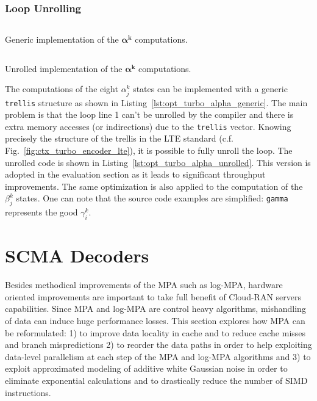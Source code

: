 \subsubsection{Loop Unrolling}

\begin{listing}[htp]
  \inputminted[frame=lines,linenos]{C++}{\curChapter/src/turbo/alpha_generic.cpp}
  \caption{Generic implementation of the $\bm{\alpha^k}$ computations.}
  \label{lst:opt_turbo_alpha_generic}
\end{listing}

\begin{listing}[htp]
  \inputminted[frame=lines,linenos]{C++}{\curChapter/src/turbo/alpha_unrolled.cpp}
  \caption{Unrolled implementation of the $\bm{\alpha^k}$ computations.}
  \label{lst:opt_turbo_alpha_unrolled}
\end{listing}

The computations of the eight $\alpha^k_j$ states can be implemented with
a generic \verb|trellis| structure as shown in
Listing~\ref{lst:opt_turbo_alpha_generic}. The main problem is that the loop
line 1 can't be unrolled by the compiler and there is extra memory accesses (or
indirections) due to the \verb|trellis| vector. Knowing precisely the structure
of the trellis in the LTE standard (c.f. Fig.~\ref{fig:ctx_turbo_encoder_lte}),
it is possible to fully unroll the loop. The unrolled code is shown in
Listing~\ref{lst:opt_turbo_alpha_unrolled}. This version is adopted in
the evaluation section as it leads to significant throughput improvements.
The same optimization is also applied to the computation of the $\beta^k_j$
states. One can note that the source code examples are simplified: \verb|gamma|
represents the good $\gamma^k_i$.

\section{SCMA Decoders}
\label{sec:opt_scma}

Besides methodical improvements of the MPA such as log-MPA, hardware oriented
improvements are important to take full benefit of Cloud-RAN servers
capabilities. Since MPA and log-MPA are control heavy algorithms, mishandling of
data can induce huge performance losses. This section explores how MPA can be
reformulated: 1) to improve data locality in cache and to reduce cache misses
and branch mispredictions 2) to reorder the data paths in order to help
exploiting data-level parallelism at each step of the MPA and log-MPA algorithms
and 3) to exploit approximated modeling of additive white Gaussian noise in
order to eliminate exponential calculations and to drastically reduce the number
of SIMD instructions.

